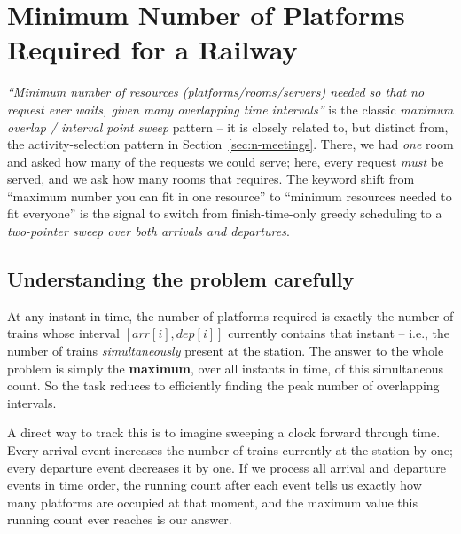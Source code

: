 \section{Minimum Number of Platforms Required for a Railway}
\label{sec:minimum-platforms}


\begin{patternbox}
\emph{``Minimum number of resources (platforms/rooms/servers) needed so that
no request ever waits, given many overlapping time intervals''} is the
classic \emph{maximum overlap / interval point sweep} pattern -- it is
closely related to, but distinct from, the activity-selection pattern in
Section~\ref{sec:n-meetings}. There, we had \emph{one} room and asked how
many of the requests we could serve; here, every request \emph{must} be
served, and we ask how many rooms that requires. The keyword shift from
``maximum number you can fit in one resource'' to ``minimum resources needed
to fit everyone'' is the signal to switch from finish-time-only greedy
scheduling to a \emph{two-pointer sweep over both arrivals and departures}.
\end{patternbox}

\subsection*{Understanding the problem carefully}

At any instant in time, the number of platforms required is exactly the
number of trains whose interval $[\textit{arr}[i], \textit{dep}[i]]$
currently contains that instant -- i.e., the number of trains
\emph{simultaneously} present at the station. The answer to the whole
problem is simply the \textbf{maximum}, over all instants in time, of this
simultaneous count. So the task reduces to efficiently finding the peak
number of overlapping intervals.

A direct way to track this is to imagine sweeping a clock forward through
time. Every arrival event increases the number of trains currently at the
station by one; every departure event decreases it by one. If we process
all arrival and departure events in time order, the running count after
each event tells us exactly how many platforms are occupied at that moment,
and the maximum value this running count ever reaches is our answer.

